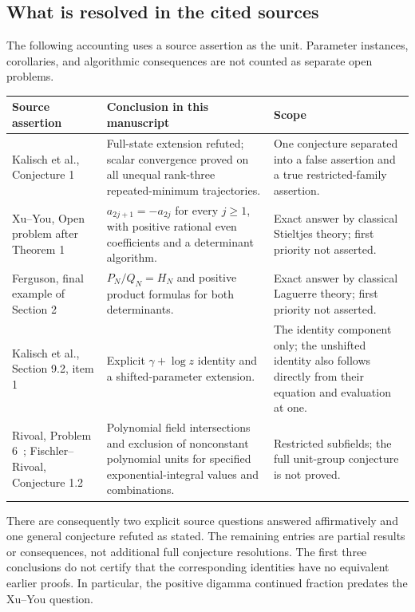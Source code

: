\documentclass[11pt,a4paper]{article}
\theoremstyle{definition}
\theoremstyle{remark}
\numberwithin{equation}{section}
\begin{document}
\subsection{What is resolved in the cited sources}

The following accounting uses a source assertion as the unit. Parameter
instances, corollaries, and algorithmic consequences are not counted as
separate open problems.

\begin{longtable}{@{}>{\raggedright\arraybackslash}p{}>{\raggedright\arraybackslash}p{}>{\raggedright\arraybackslash}p{}@{}}
\toprule
Source assertion & Conclusion in this manuscript & Scope \\
\midrule
\endhead
Kalisch et al., Conjecture 1~\cite{p3:KMLWSK26}
& Full-state extension refuted; scalar convergence proved on all unequal
rank-three repeated-minimum trajectories.
& One conjecture separated into a false assertion and a true restricted-family assertion.\\[6pt]
Xu--You, Open problem after Theorem 1~\cite{p3:XuYou2014}
& $a_{2j+1}=-a_{2j}$ for every $j\ge1$, with positive rational even
coefficients and a determinant algorithm.
& Exact answer by classical Stieltjes theory; first priority not asserted.\\[6pt]
Ferguson, final example of Section 2~\cite{p3:Ferguson2020}
& $P_N/Q_N=H_N$ and positive product formulas for both determinants.
& Exact answer by classical Laguerre theory; first priority not asserted.\\[6pt]
Kalisch et al., Section 9.2, item 1~\cite{p3:KMLWSK26}
& Explicit $\gamma+\log z$ identity and a shifted-parameter extension.
& The identity component only; the unshifted identity also follows directly
from their equation and evaluation at one.\\[6pt]
Rivoal, Problem 6~\cite{p3:RivoalXUPS2019}; Fischler--Rivoal, Conjecture 1.2~\cite{p3:FischlerRivoal2026Units}
& Polynomial field intersections and exclusion of nonconstant polynomial
units for specified exponential-integral values and combinations.
& Restricted subfields; the full unit-group conjecture is not proved.\\
\bottomrule
\end{longtable}

There are consequently two explicit source questions answered affirmatively
and one general conjecture refuted as stated. The remaining entries are
partial results or consequences, not additional full conjecture resolutions.
The first three conclusions do not certify that the corresponding
identities have no equivalent earlier proofs. In particular, the positive
digamma continued fraction predates the Xu--You question.
\end{document}
